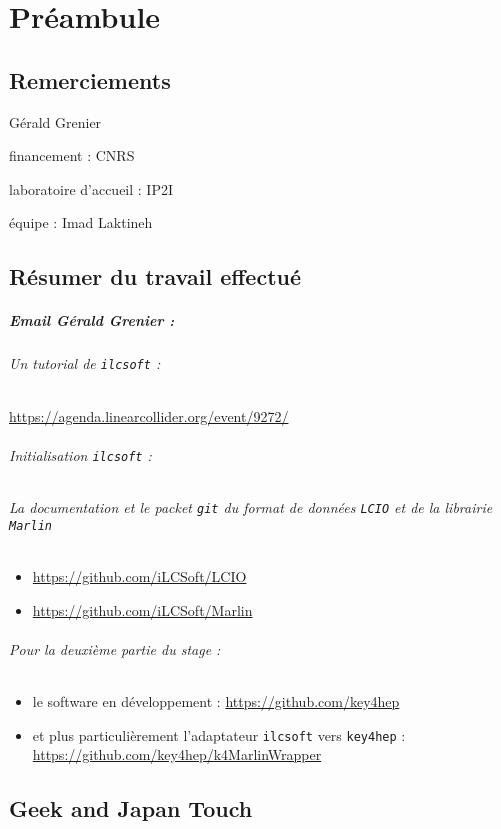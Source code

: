 \chapter*{Préambule}

\section*{Remerciements}

Gérald Grenier

financement : CNRS

laboratoire d'accueil : IP2I 

équipe : Imad Laktineh


\section*{Résumer du travail effectué}

\paragraph{Email Gérald Grenier :}

\subparagraph{Un tutorial de \texttt{ilcsoft} :} 
\url{https://agenda.linearcollider.org/event/9272/}

\subparagraph{Initialisation \texttt{ilcsoft} :}

\subparagraph{La documentation et le packet \texttt{git} du format de données \texttt{LCIO} et de la librairie \texttt{Marlin}}
\begin{itemize}
	\item \url{https://github.com/iLCSoft/LCIO} \cite{Gaede:2003ip}
	\item \url{https://github.com/iLCSoft/Marlin}
\end{itemize}


\subparagraph{Pour la deuxième partie du stage :}
\begin{itemize}

	\item le software en développement : 
			\url{https://github.com/key4hep}
			
	\item et plus particulièrement l'adaptateur \texttt{ilcsoft} vers \texttt{key4hep} : 
			\url{https://github.com/key4hep/k4MarlinWrapper}
			
\end{itemize}  

\section*{Geek and Japan Touch}